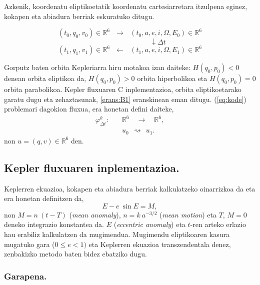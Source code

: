 Azkenik, koordenatu eliptikoetatik koordenatu cartesiarretara itzulpena eginez, kokapen eta abiadura berriak eskuratuko ditugu. 

\begin{equation*}
(t_0,q_0,v_0) \in \mathbb{R}^6 \ \ \ \longrightarrow \ \ \  (t_0,a,e,i,\Omega,E_0) \in \mathbb{R}^6 
\end{equation*}
\begin{equation*}
\quad \quad \quad \quad \quad \quad \quad \quad \downarrow \Delta t
\end{equation*}
\begin{equation*}
(t_1,q_1,v_1) \in \mathbb{R}^6 \ \ \ \longleftarrow \ \ \  (t_1,a,e,i,\Omega,E_1) \in \mathbb{R}^6 
\end{equation*}

Gorputz baten orbita Kepleriarra hiru motakoa izan daiteke: $H(q_0,p_0)<0$ denean orbita eliptikoa da, $H(q_0,p_0)>0$ orbita hiperbolikoa eta $H(q_0,p_0)=0$ orbita  parabolikoa. Kepler fluxuaren C inplementazioa, orbita eliptikoetarako garatu dugu eta zehaztasunak, \ref{erans:B1} eranskinean eman ditugu. (\ref{eq:kode}) problemari dagokion fluxua, era honetan defini daiteke,
\begin{align*}
\varphi_{\Delta t}^k:&  \quad \mathbb{R}^{6} \quad  \longrightarrow \quad \mathbb{R}^6,  \\
&  \quad u_0 \ \  \rightsquigarrow \ \ u_1. 
\end{align*} 
non $u=(q,v) \in \mathbb{R}^6$  den.


\subsection{Kepler fluxuaren inplementazioa.}

Keplerren ekuazioa, kokapen eta abiadura berriak kalkulatzeko oinarrizkoa da eta era honetan definitzen da,
\begin{equation*}
E-e \ \sin E = M,
\end{equation*}
non $M=n \ (t-T)$ (\emph{mean anomaly}), $n=k \ a^{-3/2}$ (\emph{mean motion}) eta $T$, $M=0$ deneko integrazio konstantea da. $E$ (\emph{eccentric anomaly}) eta $t$-ren arteko erlazio hau erabiliz kalkulatzen da mugimendua. Mugimendu eliptikoaren kasura mugatuko gara ($0\leq e < 1)$ eta Keplerren ekuazioa transzendentala denez, zenbakizko metodo baten bidez ebatziko dugu.

\subsubsection*{Garapena.}

